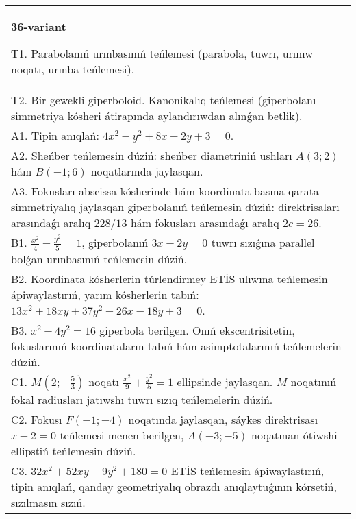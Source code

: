 \documentclass{article}
\begin{document}
\begin{tabular}{m{17cm}}
\textbf{36-variant}
\newline

T1. Parabolanıń urınbasınıń teńlemesi (parabola, tuwrı, urınıw noqatı, urınba teńlemesi).\\

T2. Bir gewekli giperboloid. Kanonikalıq teńlemesi (giperbolanı simmetriya kósheri átirapında aylandırıwdan alınǵan betlik).\\

A1. Tipin anıqlań: $4 x^{2}-y^{2}+8 x-2 y+3=0$.\\

A2. Sheńber teńlemesin dúziń: sheńber diametriniń ushları $A (3;2) $ hám $B (-1;6 ) $ noqatlarında jaylasqan.\\

A3. Fokusları abscissa kósherinde hám koordinata basına qarata simmetriyalıq jaylasqan giperbolanıń teńlemesin dúziń: direktrisaları arasındaǵı aralıq $228/13$ hám fokusları arasındaǵı aralıq $2 c=26$.\\

B1. $\frac{x^{2}}{4} - \frac{y^{2}}{5} = 1$, giperbolanıń $3x - 2y = 0$ tuwrı sızıǵına parallel bolǵan urınbasınıń teńlemesin dúziń.  \\

B2. Koordinata kósherlerin túrlendirmey ETİS ulıwma teńlemesin ápiwaylastırıń, yarım kósherlerin tabıń: $13x^{2} + 18xy + 37y^{2} - 26x - 18y + 3 = 0$.  \\

B3. $x^{2} - 4y^{2} = 16$ giperbola berilgen. Onıń ekscentrisitetin, fokuslarınıń koordinataların tabıń hám asimptotalarınıń teńlemelerin dúziń.\\

C1. $M(2; - \frac{5}{3})$ noqatı $\frac{x^{2}}{9} + \frac{y^{2}}{5} = 1$ ellipsinde jaylasqan. $M$ noqatınıń fokal radiusları jatıwshı tuwrı sızıq teńlemelerin dúziń.  \\

C2. Fokusı $F( - 1; - 4)$ noqatında jaylasqan, sáykes direktrisası $x - 2 = 0$ teńlemesi menen berilgen, $A( - 3; - 5)$ noqatınan ótiwshi ellipstiń teńlemesin dúziń.  \\

C3. $32x^{2} + 52xy - 9y^{2} + 180 = 0$ ETİS teńlemesin ápiwaylastırıń, tipin anıqlań, qanday geometriyalıq obrazdı anıqlaytuǵının kórsetiń, sızılmasın sızıń.  \\

\end{tabular}
\vspace{1cm}
\end{document}
